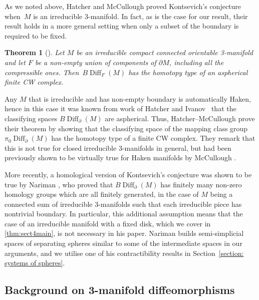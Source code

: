 \documentclass{amsart}
\theoremstyle{plain}
\newtheorem{thm}{Theorem}[section]
\theoremstyle{definition}
\DeclareMathOperator\Diff{Diff}
\newcommand{\DiffB}{\Diff_\partial}
\newcommand{\BDiff}{B\!\Diff}
\begin{document}
 As we noted above, Hatcher and McCullough \cite{HatcherMcCullough} proved Kontsevich's conjecture when~$M$ is an irreducible 3-manifold. In fact, as is the case for our result, their result holds in a more general setting when only a subset of the boundary is required to be fixed.

\begin{thm}[{\cite[Main Theorem]{HatcherMcCullough}}]\label{thm: HatcherMcCullough finiteness}
    Let $M$ be an irreducible compact connected orientable 3-manifold and let $F$ be a non-empty union of components of $\partial M$, including all the compressible ones. Then~$\BDiff_F(M)$ has the homotopy type of an aspherical finite CW complex.
\end{thm}

Any $M$ that is irreducible and has non-empty boundary is automatically Haken, hence in this case it was known from work of Hatcher \cite{Hatcher, Hatcher76} and Ivanov~\cite{Ivanov76} that the classifying spaces $\BDiff_\partial(M)$ are aspherical.  Thus, Hatcher--McCullough prove their theorem by showing that the classifying space of the mapping class group~$\pi_0\DiffB(M)$ has the homotopy type of a finite CW complex.
They remark that this is not true for closed irreducible 3-manifolds in general, but had been previously shown to be virtually true for Haken manifolds by McCullough \cite{McCullough1991}.

More recently, a homological version of Kontsevich's conjecture was shown to be true by Nariman \cite{Nariman}, who proved that $\BDiff_\partial(M)$ has finitely many non-zero homology groups which are all finitely generated, in the case of $M$ being a connected sum of irreducible 3-manifolds such that each irreducible piece has nontrivial boundary. 
In particular, this additional assumption means that the case of an irreducible manifold with a fixed disk, which we cover in \cref{thm:sect4main}, is not necessary in his paper.
Nariman builds semi-simplicial spaces of separating spheres similar to some of the intermediate spaces in our arguments, and we utilise one of his contractibility results in Section~\ref{section: systems of spheres}. 

\subsection{Background on 3-manifold diffeomorphisms}
\end{document}
